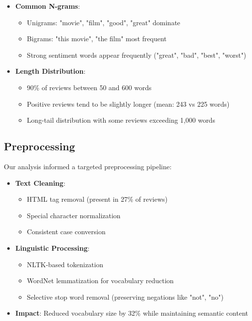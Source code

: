 \documentclass[numbers,nonatbib]{article}
\begin{document}
\begin{itemize}
    \item \textbf{Common N-grams}:
    \begin{itemize}
        \item Unigrams: "movie", "film", "good", "great" dominate
        \item Bigrams: "this movie", "the film" most frequent
        \item Strong sentiment words appear frequently ("great", "bad", "best", "worst")
    \end{itemize}
    
    \item \textbf{Length Distribution}:
    \begin{itemize}
        \item 90\% of reviews between 50 and 600 words
        \item Positive reviews tend to be slightly longer (mean: 243 vs 225 words)
        \item Long-tail distribution with some reviews exceeding 1,000 words
    \end{itemize}
\end{itemize}

\subsection{Preprocessing}
Our analysis informed a targeted preprocessing pipeline:

\begin{itemize}
    \item \textbf{Text Cleaning}:
    \begin{itemize}
        \item HTML tag removal (present in 27\% of reviews)
        \item Special character normalization
        \item Consistent case conversion
    \end{itemize}
    
    \item \textbf{Linguistic Processing}:
    \begin{itemize}
        \item NLTK-based tokenization
        \item WordNet lemmatization for vocabulary reduction
        \item Selective stop word removal (preserving negations like "not", "no")
    \end{itemize}
    
    \item \textbf{Impact}: Reduced vocabulary size by 32\% while maintaining semantic content
\end{itemize}
\end{document}
